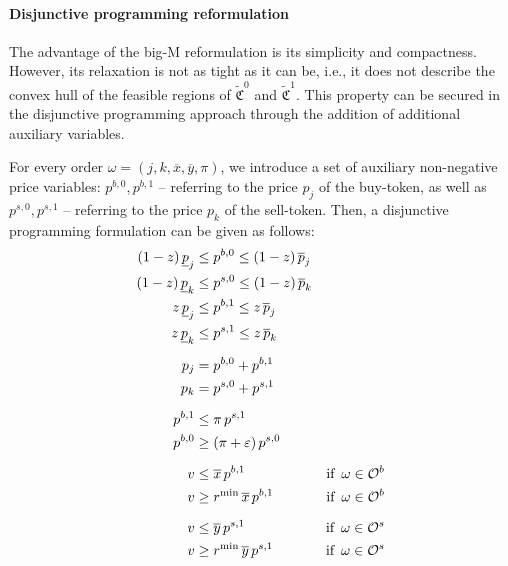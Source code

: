 \documentclass[11pt,parskip=full]{scrartcl}%
\newcommand*{\ie}{i.e., }
\newcommand*{\Min}{\mathrm{min}}
\newcommand*{\buyorders}{\mathcal{O}^b}     %
\newcommand*{\sellorders}{\mathcal{O}^s}    %
\begin{document}
\paragraph{Disjunctive programming reformulation}

The advantage of the big-M reformulation is its simplicity and compactness.
However, its relaxation is not as tight as it can be, \ie it does not describe the convex hull of
the feasible regions of $ \tilde{\mathfrak{C}}^0 $ and $ \tilde{\mathfrak{C}}^1 $.
This property can be secured in the disjunctive programming approach through the addition of
additional auxiliary variables.

For every order $ \omega = (j,k,\overline{x},\overline{y},\pi) $, we introduce a set of auxiliary
non-negative price variables:
$ p^{b,0}, p^{b,1} $ -- referring to the price $ p_j $ of the buy-token, as well as
$ p^{s,0}, p^{s,1} $ -- referring to the price $ p_k $ of the sell-token.
Then, a disjunctive programming formulation can be given as follows:
\begin{subequations}
\begin{align}
  (1-z) \, \underline{p}_j &\le p^{b,0} \le (1-z) \, \overline{p}_j
    \label{eq:mip1_dp_buyprice_0}\\
  (1-z) \, \underline{p}_k &\le p^{s,0} \le (1-z) \, \overline{p}_k
    \label{eq:mip1_dp_sellprice_0}\\
  z \, \underline{p}_j &\le p^{b,1} \le z \, \overline{p}_j
    \label{eq:mip1_dp_buyprice_1}\\
  z \, \underline{p}_k &\le p^{s,1} \le z \, \overline{p}_k
    \label{eq:mip1_dp_sellprice_1}\\[2mm]
  p_j &= p^{b,0} + p^{b,1}
    \label{eq:mip1_dp_buyprice_aggr}\\
  p_k &= p^{s,0} + p^{s,1}
    \label{eq:mip1_dp_sellprice_aggr}\\[2mm]
  p^{b,1} &\le \pi \, p^{s,1}
    \label{eq:mip1_dp_xrate_1}\\
  p^{b,0} &\ge (\pi+\varepsilon) \, p^{s,0}
    \label{eq:mip1_dp_xrate_0}\\[2mm]
  v &\le \overline{x} \, p^{b,1} &\text{if} \enskip \omega \in \buyorders
    \label{eq:mip1_dp_volume_buy_ub}\\
  v &\ge r^\Min \, \overline{x} \, p^{b,1} &\text{if} \enskip \omega \in \buyorders
    \label{eq:mip1_dp_volume_buy_lb}\\[2mm]
  v &\le \overline{y} \, p^{s,1} &\text{if} \enskip \omega \in \sellorders
    \label{eq:mip1_dp_volume_sell_ub}\\
  v &\ge r^\Min \, \overline{y} \, p^{s,1} &\text{if} \enskip \omega \in \sellorders
    \label{eq:mip1_dp_volume_sell_lb}
\end{align}
\label{eq:order_model_mip1_DP}
\end{subequations}
\end{document}
